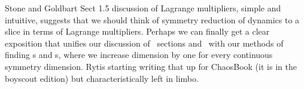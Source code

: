 {Stone and Goldbart} Sect 1.5 discussion of Lagrange
multipliers, simple and intuitive, suggests that we should think of
symmetry reduction of dynamics to a slice in terms of Lagrange
multipliers. Perhaps we can finally get a clear exposition that unifies
our discussion of \Poincare\ sections and \reducedsp\ with our methods of
finding \po s and \rpo s, where we increase dimension by one for every
continuous symmetry dimension. Rytis starting writing that up for
ChaosBook (it is in the boyscout edition) but characteristically left in
limbo.



%
